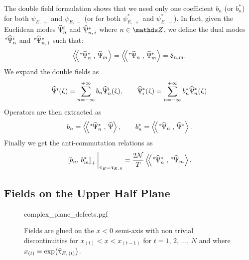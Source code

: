 The double field formulation shows that we need only one coefficient $b_n$ (or $b_n^*$) for both $\psi_{E,\, +}$ and $\psi_{E,\, -}$ (or for both $\psi^*_{E,\, +}$ and $\psi^*_{E,\, -}$).
In fact, given the Euclidean modes $\widehat{\Uppsi}^i_{n}$ and $\widehat{\Uppsi}^*_{n,\, i}$ where $n \in \Z$, we define the dual modes $\dual{\hPsi}^i_{n}$ and $\dual{\hPsi}^*_{n,\, i}$ such that:
\begin{equation}
  \lconsprod{\dual{\hPsi}^*_{n}}{\hPsi_{m}}
  =
  \lconsprod{\dual{\hPsi}_{n}}{\hPsi^*_{m}}
  =
  \delta_{n,m}.
\end{equation}
We expand the double fields as
\begin{equation}
  \widehat{\Uppsi}^i(\upzeta)
  =
  \sum\limits_{n = -\infty}^{+\infty} b_n \widehat{\Uppsi}^i_{n}(\upzeta),
  \qquad
  \widehat{\Uppsi}^*_{i}(\upzeta)
  =
  \sum\limits_{n = -\infty}^{+\infty} b^*_n \widehat{\Uppsi}^*_{n}(\upzeta)
\end{equation}
Operators are then extracted as
\begin{equation}
  b_n
  =
  \lconsprod{\dual{\hPsi}^*_{n}}{\hPsi},
  \qquad
  b^*_n
  =
  \lconsprod{\dual{\hPsi}_{n}}{\hPsi^*}.
  \label{eq:upper-half-extraction}
\end{equation}
Finally we get the anti-commutation relations as
\begin{equation}
  \eval{ \liebraket{b_n}{b^*_m}_+ }_{\tau_E = \tau_{E,\, 0}}
  =
  \frac{2 \cN}{T} \lconsprod{\dual{\hPsi}^*_{n}}{\dual{\hPsi}_m}.
\end{equation}


\subsection{Fields on the Upper Half Plane}

\begin{figure}[tbp]
  \centering
  {complex_plane_defects.pgf}
  \caption{%
    Fields are glued on the $x < 0$ semi-axis with non trivial discontinuities for $x_{(t)} < x < x_{(t-1)}$ for $t = 1,\, 2,\, \dots,\, N$ and where $x_{(t)} = \exp( \widehat{\uptau}_{E,\, (t)} )$.
  }
  \label{fig:complex-plane}
\end{figure}

